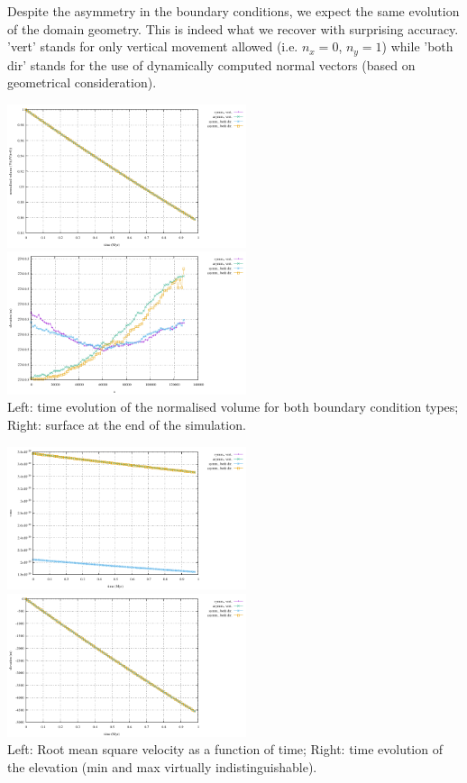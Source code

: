 Despite the asymmetry in the boundary conditions, we expect the same evolution of the domain geometry. This is indeed what we recover with surprising accuracy. 'vert' stands for only vertical movement allowed (i.e. $n_x=0$, 
$n_y=1$) while 'both dir' stands for the use of dynamically computed normal vectors (based on geometrical consideration).

\begin{center}
\includegraphics[width=7cm]{python_codes/fieldstone_54/images/exp2-3/volume.pdf}
\includegraphics[width=7cm]{python_codes/fieldstone_54/images/exp2-3/surface.pdf}\\
{\scriptsize Left: time evolution of the normalised volume for both boundary condition types; Right: surface at the end of the simulation.}
\end{center}


\begin{center}
\includegraphics[width=7cm]{python_codes/fieldstone_54/images/exp2-3/vrms.pdf}
\includegraphics[width=7cm]{python_codes/fieldstone_54/images/exp2-3/elevation.pdf}\\
{\scriptsize Left: Root mean square velocity as a function of time; Right: time evolution of the elevation (min and max virtually indistinguishable).} 
\end{center}


